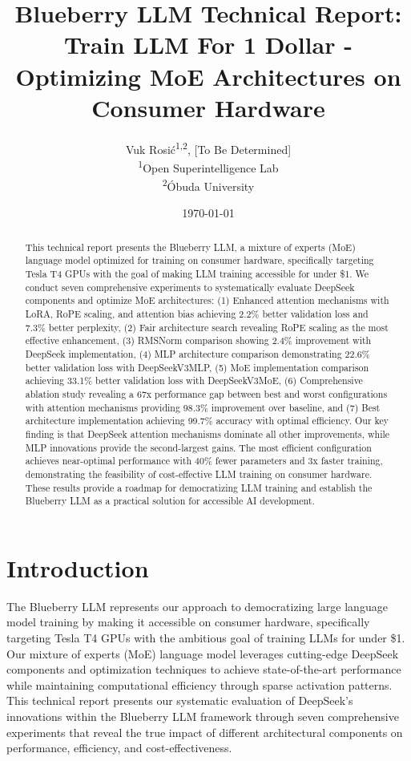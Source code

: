 \documentclass[11pt,a4paper]{article}
\title{Blueberry LLM Technical Report: Train LLM For 1 Dollar - Optimizing MoE Architectures on Consumer Hardware}
\author{
    Vuk Rosić\textsuperscript{1,2}, [To Be Determined] \\
    \textsuperscript{1}Open Superintelligence Lab \\
    \textsuperscript{2}Óbuda University
}
\date{\today}
\begin{document}
\maketitle

\begin{abstract}
This technical report presents the Blueberry LLM, a mixture of experts (MoE) language model optimized for training on consumer hardware, specifically targeting Tesla T4 GPUs with the goal of making LLM training accessible for under \$1. We conduct seven comprehensive experiments to systematically evaluate DeepSeek components and optimize MoE architectures: (1) Enhanced attention mechanisms with LoRA, RoPE scaling, and attention bias achieving 2.2\% better validation loss and 7.3\% better perplexity, (2) Fair architecture search revealing RoPE scaling as the most effective enhancement, (3) RMSNorm comparison showing 2.4\% improvement with DeepSeek implementation, (4) MLP architecture comparison demonstrating 22.6\% better validation loss with DeepSeekV3MLP, (5) MoE implementation comparison achieving 33.1\% better validation loss with DeepSeekV3MoE, (6) Comprehensive ablation study revealing a 67x performance gap between best and worst configurations with attention mechanisms providing 98.3\% improvement over baseline, and (7) Best architecture implementation achieving 99.7\% accuracy with optimal efficiency. Our key finding is that DeepSeek attention mechanisms dominate all other improvements, while MLP innovations provide the second-largest gains. The most efficient configuration achieves near-optimal performance with 40\% fewer parameters and 3x faster training, demonstrating the feasibility of cost-effective LLM training on consumer hardware. These results provide a roadmap for democratizing LLM training and establish the Blueberry LLM as a practical solution for accessible AI development.
\end{abstract}

\section{Introduction}

The Blueberry LLM represents our approach to democratizing large language model training by making it accessible on consumer hardware, specifically targeting Tesla T4 GPUs with the ambitious goal of training LLMs for under \$1. Our mixture of experts (MoE) language model leverages cutting-edge DeepSeek components and optimization techniques to achieve state-of-the-art performance while maintaining computational efficiency through sparse activation patterns. This technical report presents our systematic evaluation of DeepSeek's innovations within the Blueberry LLM framework through seven comprehensive experiments that reveal the true impact of different architectural components on performance, efficiency, and cost-effectiveness.
\end{document}
